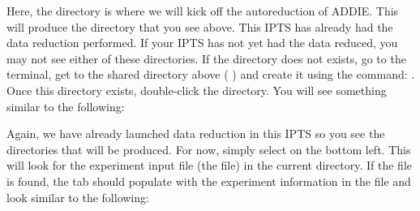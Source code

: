 \noindent{}

Here, the  directory is where we will kick off the autoreduction of ADDIE. This will produce the  directory that you see above. This IPTS has already had the data reduction performed. If your IPTS has not yet had the data reduced, you may not see either of these directories. If the  directory does not exists, go to the terminal, get to the shared directory above (  ) and create it using the command: . Once this directory exists, double-click the  directory. You will see something similar to the following:

 \noindent{}
 
 Again, we have already launched data reduction in this IPTS so you see the directories that will be produced. For now, simply select  on the bottom left. This will look for the experiment input file (the  file) in the current directory. If the file is found, the tab should populate with the experiment information in the file and look similar to the following:
 
  \noindent{}
  
